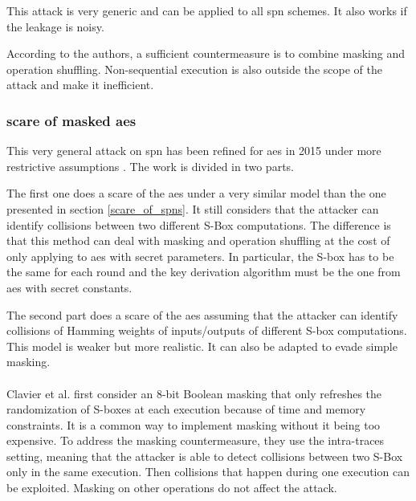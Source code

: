 \documentclass[11pt]{sdm}
\begin{document}
This attack is very generic and can be applied to all \gls{spn} schemes.
It also works if the leakage is noisy.

According to the authors, a sufficient countermeasure is to combine masking and operation shuffling.
Non-sequential execution is also outside the scope of the attack and make it inefficient.


\subsubsection{\gls{scare} of masked \gls{aes}}

This very general attack on \gls{spn} has been refined for \gls{aes} in 2015 under more restrictive assumptions \parencite{Clavier_Isorez_Marion_Wurcker_2015}.
The work is divided in two parts.

The first one does a \gls{scare} of the \gls{aes} under a very similar model than the one presented in section \ref{scare_of_spns}.
It still considers that the attacker can identify collisions between two different S-Box computations.
The difference is that this method can deal with masking and operation shuffling at the cost of only applying to \gls{aes} with secret parameters.
In particular, the S-box has to be the same for each round and the key derivation algorithm must be the one from \gls{aes} with secret constants.

The second part does a \gls{scare} of the \gls{aes} assuming that the attacker can identify collisions of Hamming weights of inputs/outputs of different S-box computations.
This model is weaker but more realistic.
It can also be adapted to evade simple masking.

\paragraph{}
Clavier et al. first consider an 8-bit Boolean masking that only refreshes the randomization of S-boxes at each execution because of time and memory constraints.
It is a common way to implement masking without it being too expensive.
To address the masking countermeasure, they use the intra-traces setting, meaning that the attacker is able to detect collisions between two S-Box only in the same execution.
Then collisions that happen during one execution can be exploited.
Masking on other operations do not affect the attack.
\end{document}
